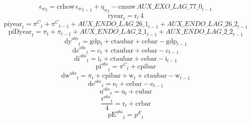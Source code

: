 \begin{dmath}
{{\epsilon_{w}}}_{t}={{\mathrm{crhow}}}\, {{\epsilon_{w}}}_{t-1}+{{\eta_{w}}}_{t}-{{\mathrm{cmuw}}}\, {AUX\_EXO\_LAG\_77\_0}_{t-1}
\end{dmath}
\begin{dmath}
{{\mathrm{ryear}}}_{t}={{\mathrm{r}}}_{t}\, 4
\end{dmath}
\begin{dmath}
{{\mathrm{piyear}}}_{t}={{\pi^{C}}}_{t}+{{\pi^{C}}}_{t-1}+{AUX\_ENDO\_LAG\_26\_1}_{t-1}+{AUX\_ENDO\_LAG\_26\_2}_{t-1}
\end{dmath}
\begin{dmath}
{{\mathrm{piDyear}}}_{t}={{\pi}}_{t}+{{\pi}}_{t-1}+{AUX\_ENDO\_LAG\_2\_1}_{t-1}+{AUX\_ENDO\_LAG\_2\_2}_{t-1}
\end{dmath}
\begin{dmath}
{{\mathrm{dy}^{obs}}}_{t}={{\mathrm{gdp}}}_{t}+{{\mathrm{ctaubar}}}+{{\mathrm{cebar}}}-{{\mathrm{gdp}}}_{t-1}
\end{dmath}
\begin{dmath}
{{\mathrm{dc}^{obs}}}_{t}={{\mathrm{c}}}_{t}+{{\mathrm{ctaubar}}}+{{\mathrm{cebar}}}-{{\mathrm{c}}}_{t-1}
\end{dmath}
\begin{dmath}
{{\mathrm{di}^{obs}}}_{t}={{\mathrm{i}}}_{t}+{{\mathrm{ctaubar}}}+{{\mathrm{cebar}}}-{{\mathrm{i}}}_{t-1}
\end{dmath}
\begin{dmath}
{{\mathrm{pi}^{obs}}}_{t}={{\pi^{C}}}_{t}+{{\mathrm{cpibar}}}
\end{dmath}
\begin{dmath}
{{\mathrm{dw}^{obs}}}_{t}={{\pi}}_{t}+{{\mathrm{cpibar}}}+{{\mathrm{w}}}_{t}+{{\mathrm{ctaubar}}}-{{\mathrm{w}}}_{t-1}
\end{dmath}
\begin{dmath}
{{\mathrm{de}^{obs}}}_{t}={{\mathrm{e}}}_{t}+{{\mathrm{cebar}}}-{{\mathrm{e}}}_{t-1}
\end{dmath}
\begin{dmath}
{{\mathrm{u}^{obs}}}_{t}={{\mathrm{u}}}_{t}+{{\mathrm{cubar}}}
\end{dmath}
\begin{dmath}
\frac{{{\mathrm{r}^{obs}}}_{t}}{4}={{\mathrm{r}}}_{t}+{{\mathrm{crbar}}}
\end{dmath}
\begin{dmath}
{{\mathrm{pE}^{obs}}}_{t}={{p^{E}}}_{t}
\end{dmath}
